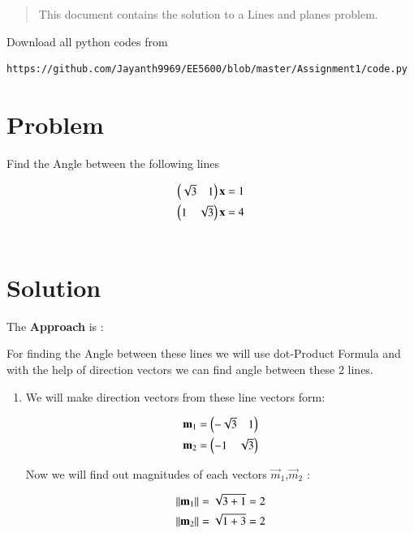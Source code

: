\begin{enumerate}[label=\thesection.\arabic*.,ref=\thesection.\theenumi]

\begin{abstract}
This document contains the solution to a Lines and planes problem.
\end{abstract}
Download all python codes from 
%
\begin{lstlisting}
https://github.com/Jayanth9969/EE5600/blob/master/Assignment1/code.py
\end{lstlisting}

\section{Problem}



Find the Angle between the following lines

\begin{align*}
  \begin{pmatrix}\sqrt{3}  &  1\end{pmatrix}\mathbf{x}=1
\\
    \begin{pmatrix}1 & \sqrt{3}\end{pmatrix}\mathbf{x}=4
\\ \\
\end{align*}

\section{Solution}
The \textbf{Approach} is :
\begin{flushleft}
    For finding the Angle between these lines we will use dot-Product Formula and with  the help of direction vectors we can find angle between these 2 lines.
\end{flushleft}

\begin{enumerate}
    \item We will make direction vectors from these line vectors form:

\begin{align}
    \mathbf{m}_1 = \begin{pmatrix}-\sqrt{3} & 1\end{pmatrix}\\
    \mathbf{m}_2 = \begin{pmatrix}-1 & \sqrt{3}\end{pmatrix}
\end{align} 


Now we will find out magnitudes of each vectors $\vec{m}_1$,$\vec{m}_2$ :

\begin{align}
    \lVert\mathbf{m}_1\rVert = \sqrt{3+1} = 2\\
    \lVert\mathbf{m}_2\rVert = \sqrt{1+3} = 2
\end{align}


\end{enumerate}
\end{enumerate}
